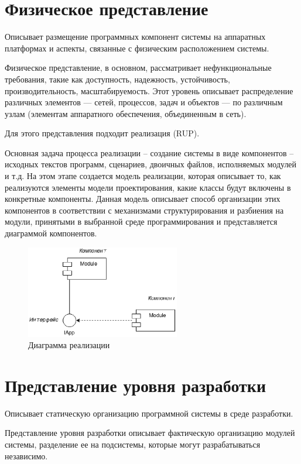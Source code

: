 \section{Физическое представление}
Описывает размещение программных компонент системы на аппаратных платформах и аспекты, связанные с физическим расположением системы.

Физическое представление, в основном, рассматривает нефункциональные требования, такие как доступность, надежность, устойчивость, производительность, масштабируемость. Этот уровень описывает распределение различных элементов --- сетей, процессов, задач и объектов --- по различным узлам (элементам аппаратного обеспечения, объединенным в сеть).

Для этого представления подходит реализация (RUP).

Основная задача процесса реализации – создание системы в виде компонентов – исходных текстов программ, сценариев, двоичных файлов, исполняемых модулей и т.д. На этом этапе создается модель реализации, которая описывает то, как реализуются элементы модели проектирования, какие классы будут включены в конкретные компоненты. Данная модель описывает способ организации этих компонентов в соответствии с механизмами структурирования и разбиения на модули, принятыми в выбранной среде программирования и представляется диаграммой компонентов.

\begin{figure}[h!]
        \centering
        \includegraphics[width=0.6\textwidth]{images/4/3.eps}
        \caption{Диаграмма реализации}
\end{figure}

\section{Представление уровня разработки}

Описывает статическую организацию программной системы в среде разработки.

Представление уровня разработки описывает фактическую организацию модулей системы, разделение ее на подсистемы, которые могут разрабатываться независимо.

